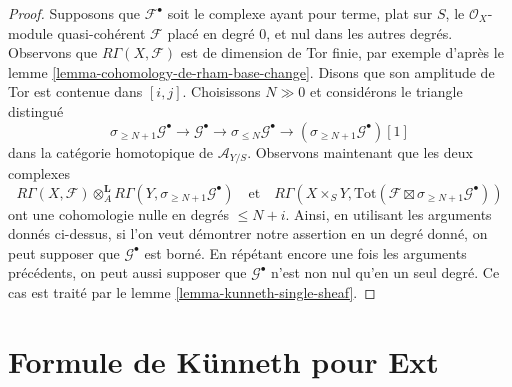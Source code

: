 \begin{proof}
\medskip\noindent
Supposons que $\mathcal{F}^\bullet$ soit le complexe ayant pour terme, plat sur $S$,
le $\mathcal{O}_X$-module quasi-cohérent $\mathcal{F}$ placé en degré $0$,
et nul dans les autres degrés. Observons que $R\Gamma(X, \mathcal{F})$ est de
dimension de Tor finie, par exemple d'après le lemme \ref{lemma-cohomology-de-rham-base-change}.
Disons que son amplitude de Tor est contenue dans $[i, j]$.
Choisissons $N \gg 0$ et considérons le triangle distingué
$$
\sigma_{\geq N + 1}\mathcal{G}^\bullet \to
\mathcal{G}^\bullet \to
\sigma_{\leq N}\mathcal{G}^\bullet \to
(\sigma_{\geq N + 1}\mathcal{G}^\bullet)[1]
$$
dans la catégorie homotopique de $\mathcal{A}_{Y/S}$. Observons maintenant que les deux complexes
$$
R\Gamma(X, \mathcal{F})
\otimes_A^\mathbf{L}
R\Gamma(Y, \sigma_{\geq N + 1}\mathcal{G}^\bullet)
\quad\text{et}\quad
R\Gamma(X \times_S Y,
\text{Tot}(\mathcal{F} \boxtimes \sigma_{\geq N + 1}\mathcal{G}^\bullet))
$$
ont une cohomologie nulle en degrés $\leq N + i$. Ainsi, en utilisant les arguments
donnés ci-dessus, si l'on veut démontrer notre assertion en un degré donné, on peut
supposer que $\mathcal{G}^\bullet$ est borné.
En répétant encore une fois les arguments précédents, on peut aussi supposer
que $\mathcal{G}^\bullet$ n'est non nul qu'en un seul degré.
Ce cas est traité par le lemme \ref{lemma-kunneth-single-sheaf}.
\end{proof}






\section{Formule de K\"unneth pour Ext}
\label{section-kunneth-Ext}

